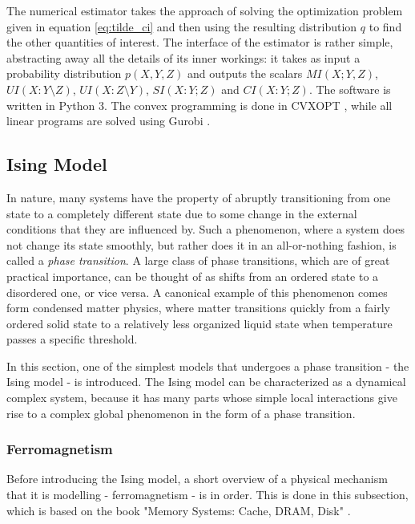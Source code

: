 \documentclass[12pt]{article}
\begin{document}
The numerical estimator takes the approach of solving the optimization problem given in equation \ref{eq:tilde_ci} and then using the resulting distribution $q$ to find the other quantities of interest. The interface of the estimator is rather simple, abstracting away all the details of its inner workings: it takes as input a  probability distribution $p(X, Y, Z)$ and outputs the scalars $MI(X;Y,Z)$, $UI(X:Y \setminus Z)$, $UI(X:Z \setminus Y)$, $SI(X:Y;Z)$ and $CI(X:Y;Z)$. The software is written in Python 3. The convex programming is done in CVXOPT \cite{cvxopt}, while all linear programs are solved using Gurobi \cite{gurobi}. 

\subsection{Ising Model}

In nature, many systems have the property of abruptly transitioning from one state to a completely different state due to some change in the external conditions that they are influenced by. Such a phenomenon, where a system does not change its state smoothly, but rather does it in an all-or-nothing fashion, is called a \textit{phase transition}. A large class of phase transitions, which are of great practical importance, can be thought of as shifts from an ordered state to a disordered one, or vice versa. A canonical example of this phenomenon comes form condensed matter physics, where matter transitions quickly from a fairly ordered solid state to a relatively less organized liquid state when temperature passes a specific threshold.\cite{inf-flow-ising-commentary}

In this section, one of the simplest models that undergoes a phase transition - the Ising model - is introduced. The Ising model can be characterized as a dynamical complex system, because it has many parts whose simple local interactions give rise to a complex global phenomenon in the form of a phase transition. 

\subsubsection{Ferromagnetism}

Before introducing the Ising model, a short overview of a physical mechanism that it is modelling - ferromagnetism - is in order. This is done in this subsection, which is based on the book "Memory Systems: Cache, DRAM, Disk" \cite{memory-systems-cache-ram}.
\end{document}
